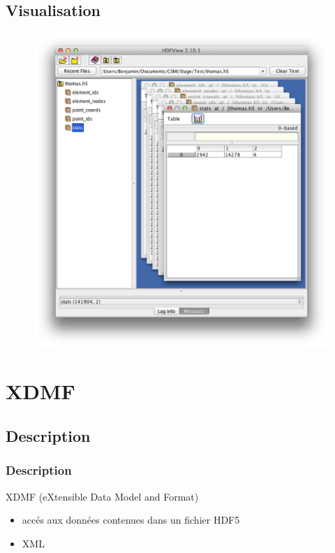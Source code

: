 \documentclass{beamer}
\begin{document}
\subsection{Visualisation}
\begin{frame}
\begin{figure}
\begin{center}
\includegraphics [width=\textwidth, height=\textheight] {HDFview.png}
\end{center}
\end{figure}
\end{frame}
\section{XDMF}
\subsection{Description}
\begin{frame}
\frametitle{Description}
XDMF (eXtensible Data Model and Format)
\begin{itemize}
\item accés aux données contenues dans un fichier HDF5
\item XML
\end{itemize}
\end{frame}
\end{document}
